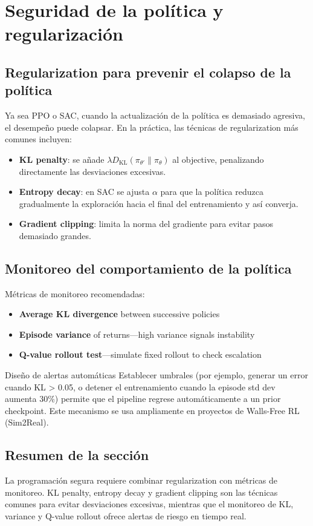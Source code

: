 \section{Seguridad de la política y regularización}

\subsection{Regularization para prevenir el colapso de la política}

Ya sea PPO o SAC, cuando la actualización de la política es demasiado agresiva, el desempeño puede colapsar. En la práctica, las técnicas de regularization más comunes incluyen:

\begin{itemize}
    \item \textbf{KL penalty}: se añade $\lambda D_{\mathrm{KL}}(\pi_{\theta'}\|\pi_\theta)$ al objective, penalizando directamente las desviaciones excesivas.
    \item \textbf{Entropy decay}: en SAC se ajusta $\alpha$ para que la política reduzca gradualmente la exploración hacia el final del entrenamiento y así converja.
    \item \textbf{Gradient clipping}: limita la norma del gradiente para evitar pasos demasiado grandes.
\end{itemize}

\subsection{Monitoreo del comportamiento de la política}

Métricas de monitoreo recomendadas:

\begin{itemize}
    \item \textbf{Average KL divergence} between successive policies
    \item \textbf{Episode variance} of returns—high variance signals instability
    \item \textbf{Q-value rollout test}—simulate fixed rollout to check escalation
\end{itemize}

\begin{knowledgebox}{Diseño de alertas automáticas}
Establecer umbrales (por ejemplo, generar un error cuando KL > 0.05, o detener el entrenamiento cuando la episode std dev aumenta 30\%) permite que el pipeline regrese automáticamente a un prior checkpoint. Este mecanismo se usa ampliamente en proyectos de Walls-Free RL (Sim2Real).
\end{knowledgebox}

\subsection{Resumen de la sección}

La programación segura requiere combinar regularization con métricas de monitoreo. KL penalty, entropy decay y gradient clipping son las técnicas comunes para evitar desviaciones excesivas, mientras que el monitoreo de KL, variance y Q-value rollout ofrece alertas de riesgo en tiempo real.

